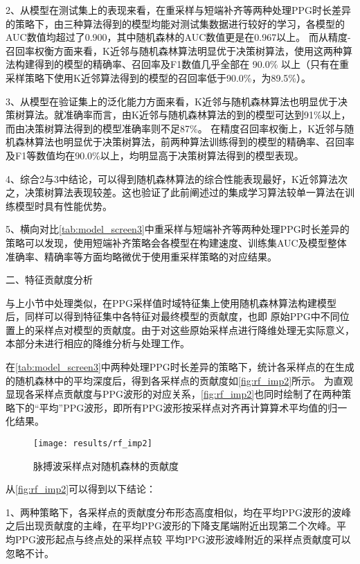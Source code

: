 2、从模型在测试集上的表现来看，在重采样与短端补齐等两种处理PPG时长差异的策略下，由三种算法得到的模型均能对测试集数据进行较好的学习，各模型的AUC数值均超过了0.900，其中随机森林的AUC数值更是在0.967以上。
而从精度-召回率权衡方面来看，K近邻与随机森林算法明显优于决策树算法，使用这两种算法构建得到的模型的精确率、召回率及F1数值几乎全部在 90.0\% 以上（只有在重采样策略下使用K近邻算法得到的模型的召回率低于90.0\%，为89.5\%）。

3、从模型在验证集上的泛化能力方面来看，K近邻与随机森林算法也明显优于决策树算法。就准确率而言，由K近邻与随机森林算法的到的模型可达到91\%以上，而由决策树算法得到的模型准确率则不足87\%。
在精度­召回率权衡上，K近邻与随机森林算法也明显优于决策树算法，前两种算法训练得到的模型的精确率、召回率及F1等数值均在90.0\%以上，均明显高于决策树算法得到的模型表现。

4、综合2与3中结论，可以得到随机森林算法的综合性能表现最好，K近邻算法次之，决策树算法表现较差。这也验证了此前阐述过的集成学习算法较单一算法在训练模型时具有性能优势。

5、横向对比\autoref{tab:model_screen3}中重采样与短端补齐等两种处理PPG时长差异的策略可以发现，使用短端补齐策略会各模型在构建速度、训练集AUC及模型整体准确率、精确率等方面均略微优于使用重采样策略的对应结果。

二、特征贡献度分析

与上小节中处理类似，在PPG采样值时域特征集上使用随机森林算法构建模型后，同样可以得到特征集中各特征对最终模型的贡献度，也即
原始PPG中不同位置上的采样点对模型的贡献度。由于对这些原始采样点进行降维处理无实际意义，本部分未进行相应的降维分析与处理工作。

在\autoref{tab:model_screen3}中两种处理PPG时长差异的策略下，统计各采样点的在生成的随机森林中的平均深度后，得到各采样点的贡献度如\autoref{fig:rf_imp2}所示。
为直观显现各采样点贡献度与PPG波形的对应关系，\autoref{fig:rf_imp2}也同时绘制了在两种策略下的“平均”PPG波形，即所有PPG波形按采样点对齐再计算算术平均值的归一化结果。

\begin{figure}[htbp]
      \centering
      \texttt{[image: results/rf\_imp2]}
      \caption{\label{fig:rf_imp2}脉搏波采样点对随机森林的贡献度}
\end{figure}

从\autoref{fig:rf_imp2}可以得到以下结论：

1、两种策略下，各采样点的贡献度分布形态高度相似，均在平均PPG波形的波峰之后出现贡献度的主峰，在平均PPG波形的下降支尾端附近出现第二个次峰。平均PPG波形起点与终点处的采样点较
平均PPG波形波峰附近的采样点贡献度可以忽略不计。

